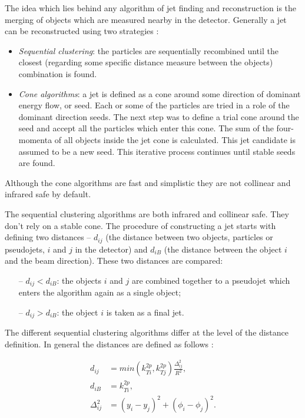 The idea which lies behind any algorithm of jet finding and reconstruction is the merging of objects which are measured nearby in the detector.
Generally a jet can be reconstructed using two strategies \cite{Salam:2007xv}:

\begin{itemize}
 \item \textit{Sequential clustering}: the particles are sequentially recombined until the closest (regarding some specific distance measure between the objects) combination is found.
 \item \textit{Cone algorithms}: a jet is defined as a cone around some direction of dominant energy flow, or seed. Each or some of the particles are tried 
 in a role of the dominant direction seeds. The next step was to define a trial cone around the seed and accept all the particles which enter this cone.
 The sum of the four-momenta of all objects inside the jet cone is calculated. This jet candidate is assumed to be a new seed. This iterative process continues
 until stable seeds are found.
\end{itemize}

Although the cone algorithms are fast and simplistic they are not collinear and infrared safe by default.

The sequential clustering algorithms are both infrared and collinear safe. They don't rely on a stable cone. The procedure of constructing
a jet starts with defining two distances -- $d_{ij}$ (the distance between two objects, particles or pseudojets, $i$ and $j$ in the detector) and $d_{iB}$ (the distance between the object $i$
and the beam direction). These two distances are compared:

\begin{itemize}
 \item [--] $d_{ij} < d_{iB}$: the objects $i$ and $j$ are combined together to a pseudojet which enters the algorithm again as a single object;
 \item [--] $d_{ij} > d_{iB}$: the object $i$ is taken as a final jet.
\end{itemize}

The different sequential clustering algorithms differ at the level of the distance definition. In general the distances are defined as follows \cite{Cacciari:2008gp}:

\begin{align}
 d_{ij} & = min(k_{Ti}^{2p}, k_{Tj}^{2p}) \frac{\Delta_{ij}^{2}}{R^{2}},\label{eq:ktDist} \\
 d_{iB} & = k_{Ti}^{2p}, \\
 \Delta_{ij}^{2} & = (y_{i} - y_{j})^{2} + (\phi_{i} - \phi_{j})^{2}.
\end{align}

